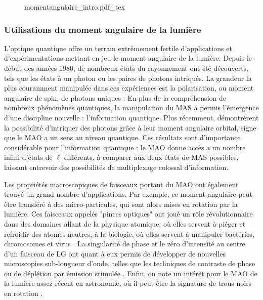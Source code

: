 \begin{figure}[!ht]
\centering
\def\svgwidth{\columnwidth}
{momentangulaire_intro.pdf_tex}
\label{Fig:Intro_MA}
\end{figure}

\subsubsection{Utilisations du moment angulaire de la lumière}
L'optique quantique offre un terrain extrêmement fertile d'applications et d'expérimentations mettant en jeu le moment angulaire de la lumière. Depuis le début des années 1980, de nombreux états du rayonnement ont été découverts, tels que les états à un photon ou les paires de photons intriqués. La grandeur la plus couramment manipulée dans ces expériences est la polarisation, ou moment angulaire de spin, de photons uniques . En plus de la compréhension de nombreux phénomènes quantiques, la manipulation du MAS a permis l'émergence d'une discipline nouvelle : l'information quantique. Plus récemment,  démontrèrent la possibilité d'intriquer des photons grâce à leur moment angulaire orbital, signe que le MAO a un sens au niveau quantique. Ces résultats sont d'importance considérable pour l'information quantique  : le MAO donne accès a un nombre infini d'états de $\ell$ différents, à comparer aux deux états de MAS possibles, laissant entrevoir des possibilités de multiplexage colossal d'information.

Les propriétés macroscopiques de faisceaux portant du MAO ont également trouvé un grand nombre d'applications. Par exemple, ce moment angulaire peut être transféré à des micro-particules, qui sont alors mises en rotation par la lumière. Ces faisceaux appelés "pinces optiques" ont joué un rôle révolutionnaire dans des domaines allant de la physique atomique, où elles servent à piéger et refroidir des atomes neutres, à la biologie, où elles servent à manipuler bactéries, chromosomes et virus . La singularité de phase et le zéro d'intensité au centre d'un faisceau de LG ont quant à eux permis de développer de nouvelles microscopies sub-longueur d'onde, telles que les techniques de contraste de phase  ou de déplétion par émission stimulée . Enfin, on note un intérêt pour le MAO de la lumière assez récent en astronomie, où il peut être la signature de trous noirs en rotation .

